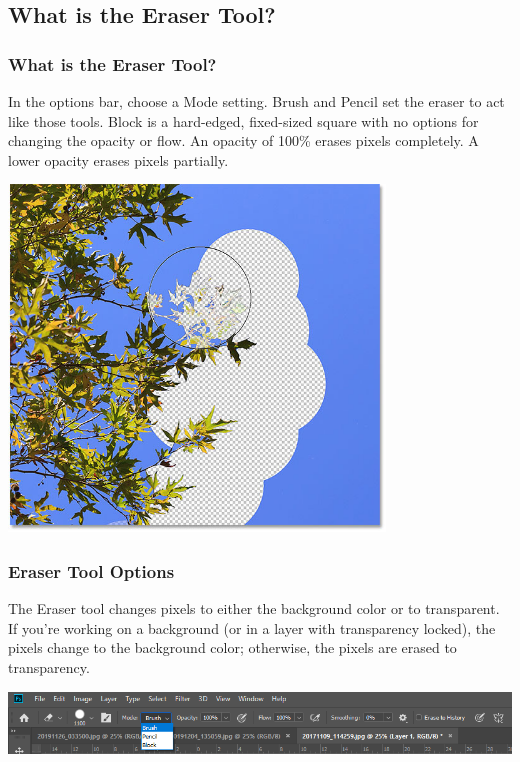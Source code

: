 \documentclass{beamer}
\begin{document}
\subsection{What is the Eraser Tool?}	
\begin{frame}
	\frametitle{What is the Eraser Tool?}
	\begin{outline}
		\1 In the options bar, choose a Mode setting. 
		\2 Brush and Pencil set the eraser to act like those tools. 
		\2 Block is a hard-edged, fixed-sized square with no options for changing the opacity or flow.
		\1 An opacity of 100\% erases pixels completely. A lower opacity erases pixels partially.
	\end{outline}
	\begin{center}
		\includegraphics[width = 0.75\textwidth]{images/background-eraser-example-2.jpg}
	\end{center}
\end{frame}

\begin{frame}
	\frametitle{Eraser Tool Options}
	\begin{outline}
		\1 The Eraser tool changes pixels to either the background color or to transparent. 
		\1 If you’re working on a background (or in a layer with transparency locked), the pixels change to the background color; 
		\2 otherwise, the pixels are erased to transparency.
	\end{outline}
	\begin{center}
		\includegraphics[width = 1.25\textwidth]{images/eraser modes.png}
	\end{center}
\end{frame}
\end{document}
